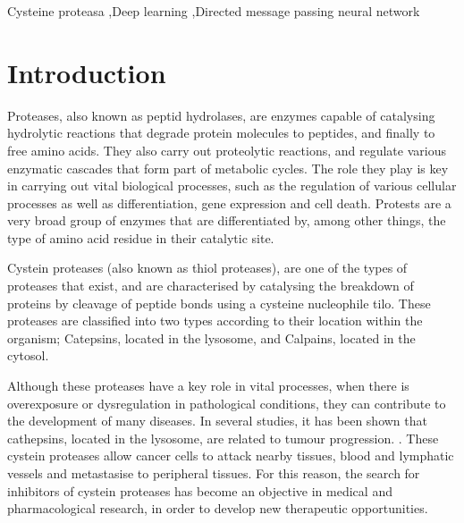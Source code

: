 \documentclass[final,times,twocolumn,article]{elsarticle}
\begin{document}
\begin{frontmatter}

\begin{keyword}
Cysteine proteasa \sep Deep learning \sep Directed message passing neural network 



\end{keyword}


\end{frontmatter}




\section{Introduction}

Proteases, also known as peptid hydrolases, are enzymes capable of catalysing hydrolytic reactions that degrade protein molecules to peptides, and finally to free amino acids. They also carry out proteolytic reactions, and regulate various enzymatic cascades that form part of metabolic cycles. \cite{Ramos2019} The role they play is key in carrying out vital biological processes, such as the regulation of various cellular processes as well as differentiation, gene expression and cell death. Protests are a very broad group of enzymes that are differentiated by, among other things, the type of amino acid residue in their catalytic site. \cite{Ramos2019}

Cystein proteases (also known as thiol proteases), are one of the types of proteases that exist, and are characterised by catalysing the breakdown of proteins by cleavage of peptide bonds using a cysteine nucleophile tilo. These proteases are classified into two types according to their location within the organism; Catepsins, located in the lysosome, and Calpains, located in the cytosol. \cite{Gupta2020}

Although these proteases have a key role in vital processes, when there is overexposure or dysregulation in pathological conditions, they can contribute to the development of many diseases.  In several studies, it has been shown that cathepsins, located in the lysosome, are related to tumour progression. \cite{Berdowska2004} \cite{Mohamed2006}. These cystein proteases allow cancer cells to attack nearby tissues, blood and lymphatic vessels and metastasise to peripheral tissues. \cite{Gupta2020} \cite{Gocheva2006} For this reason, the search for inhibitors of cystein proteases has become an objective in medical and pharmacological research, in order to develop new therapeutic opportunities. \cite{cath}
\end{document}
